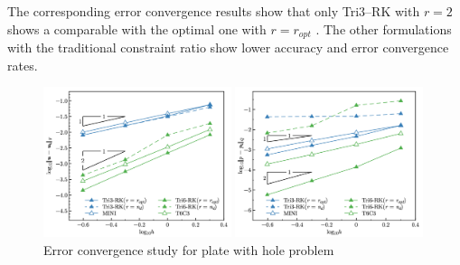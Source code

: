 \DIFaddend The corresponding error convergence  \DIFaddbegin {}\DIFaddend results show that only Tri3--RK with $r=2$ shows a comparable  \DIFaddbegin {}\DIFaddend with the optimal one with $r=r_{opt}$ \DIFaddbegin {}\DIFaddend . The other formulations with the traditional constraint ratio show lower accuracy and error convergence rates.

 \DIFaddbegin \begin{figure}[!htp]
\DIFaddendFL \centering
\begin{subcaptiongroup}
\centering
\parbox[b]{0.49\textwidth}{
    \includegraphics[width=0.49\textwidth]{png/plate_with_hole_Hdev_r1.png}
    \caption{}\label{fg:plate_with_hole_convergence_strain}
}
\parbox[b]{0.49\textwidth}{
    \includegraphics[width=0.49\textwidth]{png/plate_with_hole_L2_p_r1.png}
    \caption{}\label{fg:plate_with_hole_convergence_pressure}
}
\end{subcaptiongroup}
\caption{Error convergence study for plate with hole problem }\label{fg:plate_with_hole_convergence}
\end{figure}

